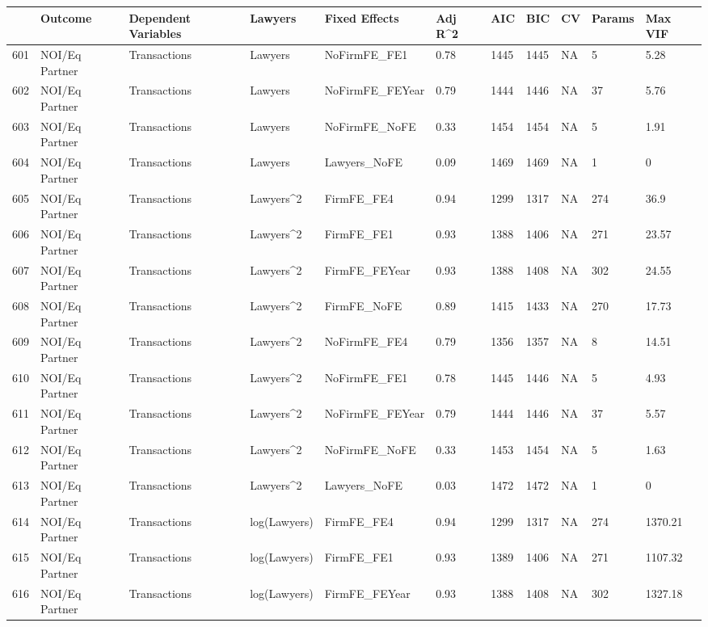 \documentclass{article}
\begin{document}
\begin{table}[H]
\centering
\begin{tabular}{rllllllllll}
  \hline
 & Outcome & Dependent Variables & Lawyers & Fixed Effects & Adj R^2 & AIC & BIC & CV & Params & Max VIF \\ 
  \hline
601 & NOI/Eq Partner & Transactions & Lawyers & NoFirmFE\_FE1 & 0.78 & 1445 & 1445 & NA & 5 & 5.28 \\ 
  602 & NOI/Eq Partner & Transactions & Lawyers & NoFirmFE\_FEYear & 0.79 & 1444 & 1446 & NA & 37 & 5.76 \\ 
  603 & NOI/Eq Partner & Transactions & Lawyers & NoFirmFE\_NoFE & 0.33 & 1454 & 1454 & NA & 5 & 1.91 \\ 
  604 & NOI/Eq Partner & Transactions & Lawyers & Lawyers\_NoFE & 0.09 & 1469 & 1469 & NA & 1 & 0 \\ 
  605 & NOI/Eq Partner & Transactions & Lawyers^2 & FirmFE\_FE4 & 0.94 & 1299 & 1317 & NA & 274 & 36.9 \\ 
  606 & NOI/Eq Partner & Transactions & Lawyers^2 & FirmFE\_FE1 & 0.93 & 1388 & 1406 & NA & 271 & 23.57 \\ 
  607 & NOI/Eq Partner & Transactions & Lawyers^2 & FirmFE\_FEYear & 0.93 & 1388 & 1408 & NA & 302 & 24.55 \\ 
  608 & NOI/Eq Partner & Transactions & Lawyers^2 & FirmFE\_NoFE & 0.89 & 1415 & 1433 & NA & 270 & 17.73 \\ 
  609 & NOI/Eq Partner & Transactions & Lawyers^2 & NoFirmFE\_FE4 & 0.79 & 1356 & 1357 & NA & 8 & 14.51 \\ 
  610 & NOI/Eq Partner & Transactions & Lawyers^2 & NoFirmFE\_FE1 & 0.78 & 1445 & 1446 & NA & 5 & 4.93 \\ 
  611 & NOI/Eq Partner & Transactions & Lawyers^2 & NoFirmFE\_FEYear & 0.79 & 1444 & 1446 & NA & 37 & 5.57 \\ 
  612 & NOI/Eq Partner & Transactions & Lawyers^2 & NoFirmFE\_NoFE & 0.33 & 1453 & 1454 & NA & 5 & 1.63 \\ 
  613 & NOI/Eq Partner & Transactions & Lawyers^2 & Lawyers\_NoFE & 0.03 & 1472 & 1472 & NA & 1 & 0 \\ 
  614 & NOI/Eq Partner & Transactions & log(Lawyers) & FirmFE\_FE4 & 0.94 & 1299 & 1317 & NA & 274 & 1370.21 \\ 
  615 & NOI/Eq Partner & Transactions & log(Lawyers) & FirmFE\_FE1 & 0.93 & 1389 & 1406 & NA & 271 & 1107.32 \\ 
  616 & NOI/Eq Partner & Transactions & log(Lawyers) & FirmFE\_FEYear & 0.93 & 1388 & 1408 & NA & 302 & 1327.18 \\ 

\end{tabular}
\end{table}
\end{document}
